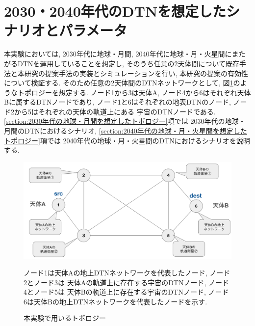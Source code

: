\section{2030・2040年代のDTNを想定したシナリオとパラメータ}
本実験においては, 2030年代に地球・月間, 2040年代に地球・月・火星間にまたがるDTNを運用していることを想定し, 
そのうち任意の2天体間について既存手法と本研究の提案手法の実装とシミュレーションを行い, 
本研究の提案の有効性について検証する. そのため任意の2天体間のDTNネットワークとして, 
図\ref{fig:experimentation_topology}のようなトポロジーを想定する. 
ノード1から3は天体A, ノード4から6はそれぞれ天体Bに属するDTNノードであり, 
ノード1と6はそれぞれの地表DTNのノード, ノード2から5はそれぞれの天体の軌道上にある
宇宙のDTNノードである. 
\ref{section:2030年代の地球・月間を想定したトポロジー}項では
2030年代の地球・月間のDTNにおけるシナリオ, 
\ref{section:2040年代の地球・月・火星間を想定したトポロジー}項では
2040年代の地球・月・火星間のDTNにおけるシナリオを説明する. 
\begin{figure}[tbh]
    \centering
    \includegraphics[width=0.7\textheight]{img/thesis_Sample_topology.pdf}
    \caption{本実験で用いるトポロジー}
    \label{fig:experimentation_topology}
    \begin{minipage}{\textwidth}
        \raggedright
        \vspace{3mm}
        ノード1は天体Aの地上DTNネットワークを代表したノード, ノード2とノード3は
        天体Aの軌道上に存在する宇宙のDTNノード, ノード4とノード5は
        天体Bの軌道上に存在する宇宙のDTNノード, 
        ノード6は天体Bの地上DTNネットワークを代表したノードを示す. 
    \end{minipage}
\end{figure}

